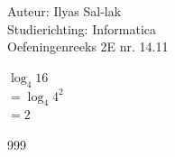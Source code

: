 \documentclass[a4paper]{article}
\begin{document}
\noindent \large Auteur: Ilyas Sal-lak \\
\noindent \large Studierichting: Informatica\\
\noindent \large Oefeningenreeks 2E nr. 14.11\\

\medskip

\normalsize

$\log_4 16$ \\

$= \log_4 4^2$ \\

$= 2$

\begin{thebibliography}{999}
\end{thebibliography}
\end{document}
